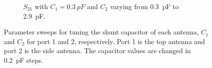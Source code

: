 \begin{figure}[htbp]
\begin{subfigure}{0.49\linewidth}
        \caption{$S_{21}$ with $C_1=\SI{0.3}{pF}$ and $C_2$ varying from \SI{0.3}{pF} to \SI{2.9}{pF}.}
    \end{subfigure}
    \caption{Parameter sweeps for tuning the shunt capacitor of each antenna, $C_{1}$ and $C_{2}$ for port 1 and 2, respectively. Port 1 is the top antenna and port 2 is the side antenna. The capacitor values are changed in \SI{0.2}{pF} steps.}
    \label{fig:ant2sweeps}
\end{figure}




